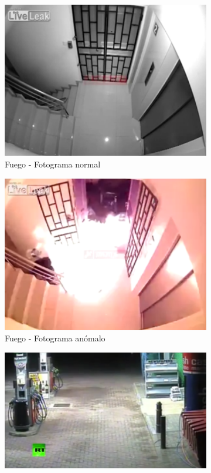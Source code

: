 \documentclass[../main.tex]{memoir}
\begin{document}
\begin{figure}[hbtp]
  \centering
  \begin{subfigure}{0.48\textwidth}
    \centering
    \includegraphics[width=\linewidth]{images/ucf-examples/arson-normal}
    \caption{Fuego - Fotograma normal}
  \end{subfigure}
  \begin{subfigure}{0.48\textwidth}
    \centering
    \includegraphics[width=\linewidth]{images/ucf-examples/arson-abnormal}
    \caption{Fuego - Fotograma anómalo}
  \end{subfigure}
  \begin{subfigure}{0.48\textwidth}
    \centering
    \includegraphics[width=\linewidth]{images/ucf-examples/explosion-normal}

\end{subfigure}
\end{figure}
\end{document}
